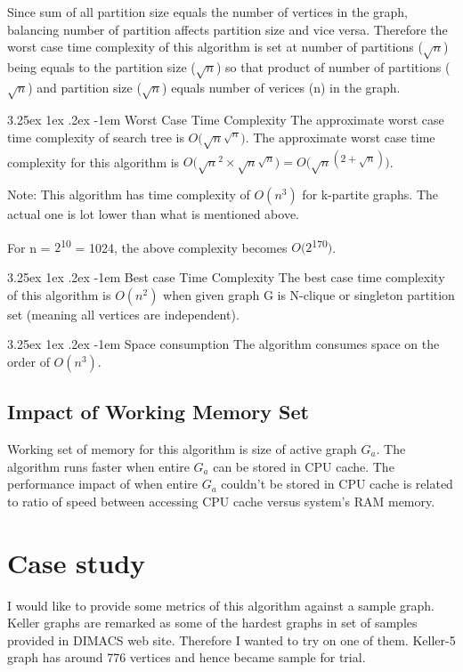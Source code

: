 \documentclass[12pt]{article}
\makeatletter
\theoremstyle{plain}
\theoremstyle{definition}
\renewcommand\paragraph{\@startsection{paragraph}{5}{\z@}%
	{3.25ex \@plus1ex \@minus.2ex}%
	{-1em}%
	{\normalfont\normalsize\bfseries}}
\makeatother
\begin{document}
Since sum of all partition size equals the number of vertices in the graph, balancing number of partition affects partition size and vice versa. Therefore the worst case time complexity of this algorithm is set at number of partitions ($\sqrt{n}$) being equals to the partition size ($\sqrt{n}$) so that product of number of partitions ($\sqrt{n}$) and partition size ($\sqrt{n}$) equals number of verices (n) in the graph.

\paragraph{Worst Case Time Complexity} The approximate worst case time complexity of search tree is $O(\sqrt{n}$\textsuperscript{$\sqrt{n}$}$)$.
The approximate worst case time complexity for this algorithm is 
$O(\sqrt{n}^2 \times \sqrt{n}$\textsuperscript{$\sqrt{n}$}$) = O(\sqrt{n}$\textsuperscript{$(2 + \sqrt{n})$}$)$.

Note: This algorithm has time complexity of $O(n^3)$ for k-partite graphs. The actual one is lot lower than what is mentioned above.


For n = $2$\textsuperscript{10} = 1024, the above complexity becomes $O(2$\textsuperscript{170}$)$.

\paragraph{Best case Time Complexity}
The best case time complexity of this algorithm is $O(n^2)$ when given graph G is N-clique or singleton partition set (meaning all vertices are independent).

\paragraph{Space consumption}
The algorithm consumes space on the order of $O(n^3)$.

\subsection{Impact of Working Memory Set}
Working set of memory for this algorithm is size of active graph $G_a$. The algorithm runs faster when entire $G_a$ can be stored in CPU cache. The performance impact of when entire $G_a$ couldn't be stored in CPU cache is related to ratio of speed between accessing CPU cache versus system's RAM memory.


\section{Case study}
I would like to provide some metrics of this algorithm against a sample graph. Keller graphs are remarked as some of the hardest graphs in set of samples provided in DIMACS web site. Therefore I wanted to try on one of them. Keller-5 graph has around 776 vertices and hence became sample for trial.
\end{document}
